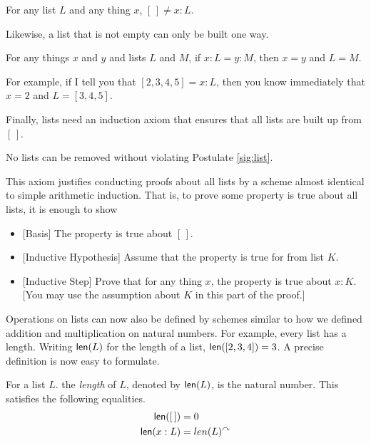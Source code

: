 \begin{postulate}
	For any list $L$ and any thing $x$, $[\,]\neq x:L$.
\end{postulate}

Likewise, a list that is not empty can only be built one way.

\begin{postulate}
	For any things $x$ and $y$ and lists $L$ and $M$, if $x:L = y:M$, then $x=y$ and $L=M$.
\end{postulate}

For example, if I tell you that $[2,3,4,5] = x:L$, then you know immediately that $x=2$ and $L=[3,4,5]$.

Finally, lists need an induction axiom that ensures that all lists are built up from $[\,]$.


\begin{postulate}\label{post:ListInd}
	 No lists can be removed without violating Postulate \ref{sig:list}.
\end{postulate}

This axiom justifies conducting proofs about all lists by a scheme almost identical to simple arithmetic induction.
That is, to prove some property is true about all lists, it is enough to show
\begin{itemize}
\item{}[Basis] The property is true about $[\,]$.
\item{}[Inductive Hypothesis] Assume that the property is true for from list $K$.
\item{}[Inductive Step] Prove that for any thing $x$, the property is true about $x:K$. [You may use the
  assumption about $K$ in this part of the proof.]
\end{itemize}

Operations on lists can now also be defined by schemes similar to how 
we defined addition and multiplication on natural numbers. For example,
every list has a length. Writing $\mathord{\textsf{len}}(L)$ for the length of a list,
$\mathord{\textsf{len}}([2,3,4]) = 3$.  A precise definition is now easy to formulate.

\begin{defn}
  For a list $L$. the \emph{length} of $L$, denoted by $\mathord{\textsf{len}}(L)$, is
  the natural number. This satisfies the following equalities.
  \begin{align*}
    \mathord{\textsf{len}}([\,]) &= 0\\
    \mathord{\textsf{len}}(x:L) &= len(L)^\curvearrowright
  \end{align*}
\end{defn}

